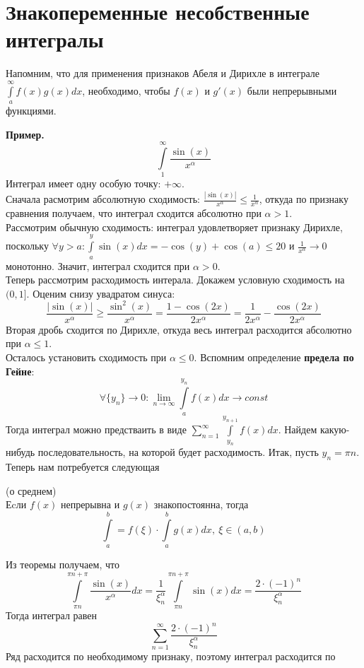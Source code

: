 \section{Знакопеременные несобственные интегралы}
Напомним, что для применения признаков Абеля и Дирихле в интеграле 
$\int\limits_{a}^{\infty} f(x)g(x)dx$, необходимо, чтобы $f(x)$ и $g'(x)$ были 
непрерывными функциями.

\textbf{Пример.} $$\int\limits_{1}^{\infty}\frac{\sin(x)}{x^\alpha}$$ 
Интеграл имеет одну особую точку: $+\infty$.\\
Сначала расмотрим абсолютную сходимость: 
$\frac{|\sin(x)|}{x^\alpha}\leqslant \frac{1}{x^\alpha}$, откуда
по признаку сравнения получаем, что интеграл сходится абсолютно при 
$\alpha>1$.\\
Рассмотрим обычную сходимость: интеграл удовлетворяет признаку Дирихле,
поскольку 
$\forall y>a: \int\limits_{a}^{y}\sin(x)dx=-\cos(y)+\cos(a)\leqslant 20$ и
$\frac{1}{x^\alpha}\to 0$ монотонно. Значит, интеграл сходится при 
$\alpha>0$.\\
Теперь рассмотрим расходимость интерала. Докажем условную сходимость на
$(0,1]$.
Оценим снизу увадратом синуса:
$$\frac{|\sin(x)|}{x^\alpha}\geqslant \frac{\sin^2(x)}{x^\alpha}=
\frac{1-\cos(2x)}{2x^\alpha}=\frac{1}{2x^\alpha}-\frac{\cos(2x)}{2x^\alpha}$$ 
Вторая дробь сходится по Дирихле, откуда весь интеграл расходится абсолютно
при $\alpha\leqslant 1$.\\
Осталось установить сходимость при $\alpha\leqslant 0$. Вспомним определение
\textbf{предела по Гейне}:
$$\forall \{y_n\}\to 0: \lim\limits_{n \to \infty} \int\limits_{a}^{y_n}
f(x)dx\to const$$ 
Тогда интеграл можно предстваить в виде $\sum\limits_{n=1}^{\infty} 
\int\limits_{y_n}^{y_{n+1}}f(x)dx$. Найдем какую-нибудь последовательность,
на которой будет расходимость. Итак, пусть $y_n=\pi n$.\\
Теперь нам потребуется следующая 
\begin{theor}(о среднем)\\
Еcли $f(x)$ непрерывна и  $g(x)$ знакопостоянна, тогда
$$\int\limits_{a}^{b}=f(\xi)\cdot\int\limits_{a}^{b} g(x)dx,~\xi\in(a,b)$$
\end{theor}
Из теоремы получаем, что
$$\int\limits_{\pi n}^{\pi n+\pi} \frac{\sin(x)}{x^\alpha}dx = 
\frac{1}{\xi^\alpha_n}\int\limits_{\pi n}^{\pi n+\pi}\sin(x)dx = 
\frac{2\cdot (-1)^n}{\xi^\alpha_n}$$ 
Тогда интеграл равен
$$\sum\limits_{n=1}^{\infty}\frac{2\cdot (-1)^n}{\xi^\alpha_n}$$
Ряд расходится по необходимому признаку, поэтому интеграл расходится по 
